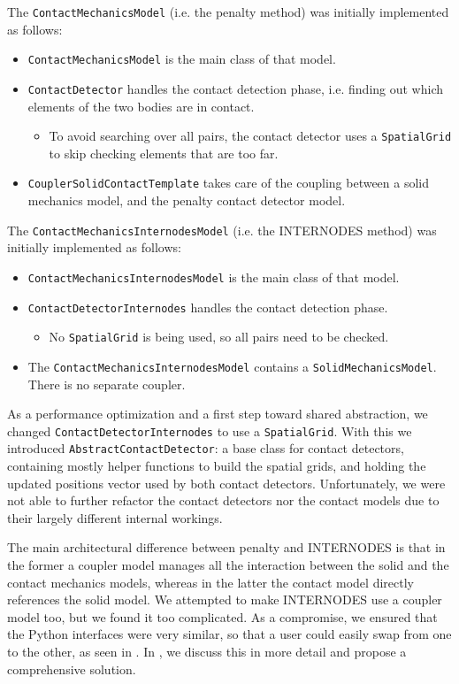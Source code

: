 \documentclass[11pt, a4paper]{article}
\begin{document}
The \texttt{ContactMechanicsModel} (i.e. the penalty method) was initially implemented as follows:
\begin{itemize}
    \item \texttt{ContactMechanicsModel} is the main class of that model.
    \item \texttt{ContactDetector} handles the contact detection phase, i.e. finding out which elements of the two bodies are in contact.
    \begin{itemize}
        \item To avoid searching over all pairs, the contact detector uses a \texttt{SpatialGrid} to skip checking elements that are too far.
    \end{itemize}
    \item \texttt{CouplerSolidContactTemplate} takes care of the coupling between a solid mechanics model, and the penalty contact detector model.
\end{itemize}

The \texttt{ContactMechanicsInternodesModel} (i.e. the INTERNODES method) was initially implemented as follows:
\begin{itemize}
    \item \texttt{ContactMechanicsInternodesModel} is the main class of that model.
    \item \texttt{ContactDetectorInternodes} handles the contact detection phase.
    \begin{itemize}
        \item No \texttt{SpatialGrid} is being used, so all pairs need to be checked.
    \end{itemize}
    \item The \texttt{ContactMechanicsInternodesModel} contains a \texttt{SolidMechanicsModel}. There is no separate coupler.
\end{itemize}

As a performance optimization and a first step toward shared abstraction, we changed \texttt{ContactDetectorInternodes} to use a \texttt{SpatialGrid}. With this we introduced \texttt{AbstractContactDetector}: a base class for contact detectors, containing mostly helper functions to build the spatial grids, and holding the updated positions vector used by both contact detectors. Unfortunately, we were not able to further refactor the contact detectors nor the contact models due to their largely different internal workings.

The main architectural difference between penalty and INTERNODES is that in the former a coupler model manages all the interaction between the solid and the contact mechanics models, whereas in the latter the contact model directly references the solid model. We attempted to make INTERNODES use a coupler model too, but we found it too complicated. As a compromise, we ensured that the Python interfaces were very similar, so that a user could easily swap from one to the other, as seen in . In , we discuss this in more detail and propose a comprehensive solution.
\end{document}
